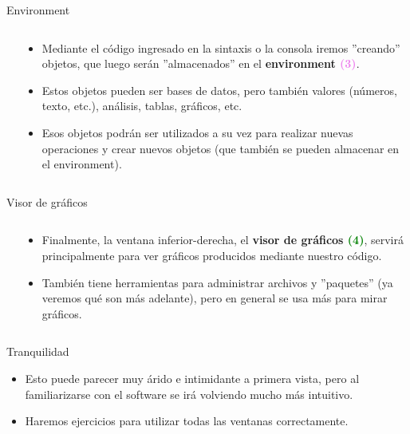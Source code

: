 \documentclass[
  13pt,
  ignorenonframetext,
]{beamer}
\begin{document}
\begin{frame}{Environment}
\label{environment-1}
\begin{columns}[t]
    \begin{column}{.5\textwidth}
    \end{column}
    \begin{column}{.65\textwidth}
      \begin{itemize}
        \item Mediante el código ingresado en la sintaxis o la consola iremos ''creando'' objetos, que luego serán ''almacenados'' en el \textbf{environment \textcolor{violet}{(3)}}.
        \item Estos objetos pueden ser bases de datos, pero también valores (números, texto, etc.), análisis, tablas, gráficos, etc.
        \item Esos objetos podrán ser utilizados a su vez para realizar nuevas operaciones y crear nuevos objetos (que también se pueden almacenar en el environment).
      \end{itemize}
    \end{column}
  \end{columns}
\end{frame}

\begin{frame}{Visor de gráficos}
\label{visor-de-gruxe1ficos}
\begin{columns}[t]
    \begin{column}{.65\textwidth}
    \end{column}
    \begin{column}{.5\textwidth}
      \begin{itemize}
        \item Finalmente, la ventana inferior-derecha, el \textbf{visor de gráficos \textcolor{green}{(4)}}, servirá principalmente para ver gráficos producidos mediante nuestro código.
        \item También tiene herramientas para administrar archivos y ''paquetes'' (ya veremos qué son más adelante), pero en general se usa más para mirar gráficos.
      \end{itemize}
    \end{column}
  \end{columns}
\end{frame}

\begin{frame}{Tranquilidad}
\label{tranquilidad}
\begin{itemize}
\item
  Esto puede parecer muy árido e intimidante a primera vista, pero al
  familiarizarse con el software se irá volviendo mucho más intuitivo.
\item
  Haremos ejercicios para utilizar todas las ventanas correctamente.
\end{itemize}
\end{frame}
\end{document}
